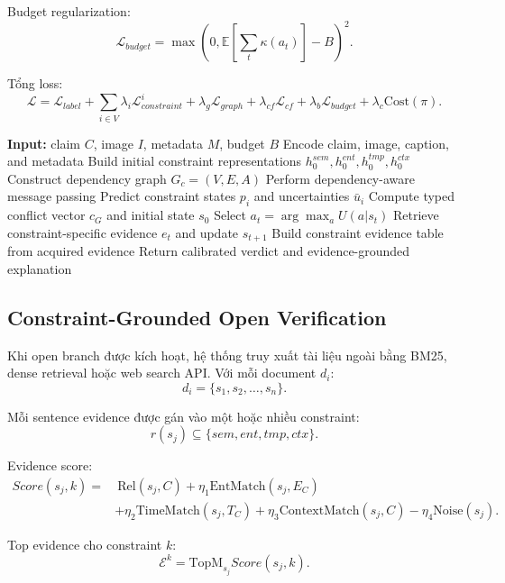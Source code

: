 \documentclass[11pt,a4paper]{article}
\begin{document}
Budget regularization:
\[
\mathcal{L}_{budget}
=
\max(0,\mathbb{E}[\sum_t\kappa(a_t)]-B)^2.
\]

Tổng loss:
\[
\mathcal{L}
=
\mathcal{L}_{label}
+
\sum_{i\in V}\lambda_i\mathcal{L}_{constraint}^{i}
+
\lambda_g\mathcal{L}_{graph}
+
\lambda_{cf}\mathcal{L}_{cf}
+
\lambda_b\mathcal{L}_{budget}
+
\lambda_c\text{Cost}(\pi).
\]

\begin{algorithm}[htbp]
\caption{GraphCURE Inference}
\begin{algorithmic}[1]
\STATE \textbf{Input:} claim $C$, image $I$, metadata $M$, budget $B$
\STATE Encode claim, image, caption, and metadata
\STATE Build initial constraint representations $h_0^{sem},h_0^{ent},h_0^{tmp},h_0^{ctx}$
\STATE Construct dependency graph $G_c=(V,E,A)$
\STATE Perform dependency-aware message passing
\STATE Predict constraint states $p_i$ and uncertainties $\bar{u}_i$
\STATE Compute typed conflict vector $c_G$ and initial state $s_0$
\STATE Select $a_t=\arg\max_a U(a|s_t)$
\STATE Retrieve constraint-specific evidence $e_t$ and update $s_{t+1}$
\ENDWHILE
\STATE Build constraint evidence table from acquired evidence
\STATE Return calibrated verdict and evidence-grounded explanation
\end{algorithmic}
\end{algorithm}

\subsection{Constraint-Grounded Open Verification}

Khi open branch được kích hoạt, hệ thống truy xuất tài liệu ngoài bằng BM25, dense retrieval hoặc web search API. Với mỗi document $d_i$:
\[
d_i=\{s_1,s_2,\ldots,s_n\}.
\]

Mỗi sentence evidence được gán vào một hoặc nhiều constraint:
\[
r(s_j)\subseteq\{sem,ent,tmp,ctx\}.
\]

Evidence score:
\[
\begin{aligned}
Score(s_j,k)
=&\ \text{Rel}(s_j,C)
+\eta_1\text{EntMatch}(s_j,E_C)\\
&+\eta_2\text{TimeMatch}(s_j,T_C)
+\eta_3\text{ContextMatch}(s_j,C)
-\eta_4\text{Noise}(s_j).
\end{aligned}
\]

Top evidence cho constraint $k$:
\[
\mathcal{E}^k=\text{TopM}_{s_j}Score(s_j,k).
\]
\end{document}

